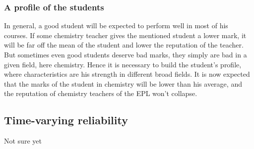 \documentclass[12pt,a4paper,notitlepage]{article}
\begin{document}
\subsubsection*{A profile of the students}
In general, a good student will be expected to perform well in most of his courses. If some chemistry teacher gives the mentioned student a lower mark, it will be far off the mean of the student and lower the reputation of the teacher.\\
But sometimes even good students deserve bad marks, they simply are bad in a given field, here chemistry. Hence it is necessary to build the student's profile, where characteristics are his strength in different broad fields. It is now expected that the marks of the student in chemistry will be lower than his average, and the reputation of chemistry teachers of the EPL won't collapse.

\subsection*{Time-varying reliability}
Not sure yet
\end{document}
